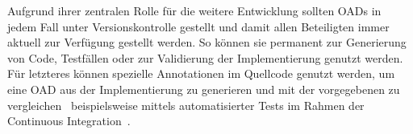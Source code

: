 Aufgrund ihrer zentralen Rolle für die weitere Entwicklung sollten \acp{OAD} in jedem Fall unter Versionskontrolle gestellt und damit allen Beteiligten immer aktuell zur Verfügung gestellt werden.
So können sie permanent zur Generierung von Code, Testfällen oder zur Validierung der Implementierung genutzt werden.
Für letzteres können spezielle Annotationen im Quellcode genutzt werden, um eine \ac{OAD} aus der Implementierung zu generieren und mit der vorgegebenen zu vergleichen \textendash\ beispielsweise mittels automatisierter Tests im Rahmen der Continuous Integration~\cite{ope24}.
